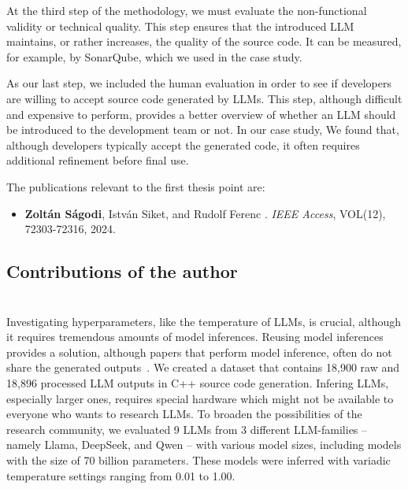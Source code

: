 \documentclass[12pt,a4paper]{extarticle}
\begin{document}
At the third step of the methodology, we must evaluate the non-functional validity or technical quality.
This step ensures that the introduced LLM maintains, or rather increases, the quality of the source code.
It can be measured, for example, by SonarQube, which we used in the case study.

As our last step, we included the human evaluation in order to see if developers are willing to accept source code generated by LLMs.
This step, although difficult and expensive to perform, provides a better overview of whether an LLM should be introduced to the development team or not.
In our case study, We found that, although developers typically accept the generated code, it often requires additional refinement before final use.

\vspace{2em}
The publications relevant to the first thesis point are:
\begin{itemize}
	\item \textbf{Zoltán Ságodi}, István Siket, and Rudolf Ferenc
	.
	\newblock \emph{IEEE Access}, VOL(12), 72303-72316, 2024.
\end{itemize}

\subsection*{Contributions of the author}




\section{\thesispointtwo}

Investigating hyperparameters, like the temperature of LLMs, is crucial, although it requires tremendous amounts of model inferences.
Reusing model inferences provides a solution, although papers that perform model inference, often do not share the generated outputs~\cite{data_no_share_1,data_no_share_2,data_no_share_3,data_no_share_4,data_no_share_5}.
We created a dataset that contains 18,900 raw and 18,896 processed LLM outputs in C++ source code generation.
Infering LLMs, especially larger ones, requires special hardware which might not be available to everyone who wants to research LLMs.
To broaden the possibilities of the research community, we evaluated 9 LLMs from 3 different LLM-families -- namely Llama, DeepSeek, and Qwen -- with various model sizes, including models with the size of 70 billion parameters.
These models were inferred with variadic temperature settings ranging from 0.01 to 1.00.
\end{document}
